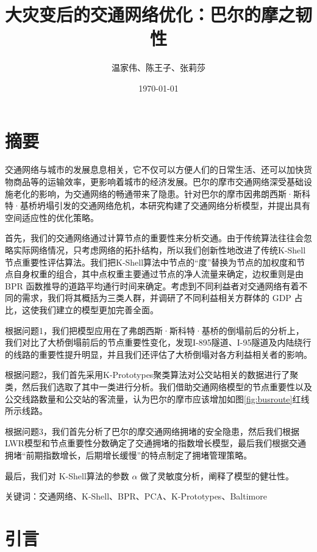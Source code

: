 \documentclass[12pt, a4paper, oneside]{ctexart}
\title{大灾变后的交通网络优化：巴尔的摩之韧性}
\author{温家伟、陈王子、张莉莎}
\date{\today}
\begin{document}
\maketitle


\setcounter{page}{0}
\maketitle
\thispagestyle{empty}

\section{摘要}

交通网络与城市的发展息息相关，它不仅可以方便人们的日常生活、还可以加快货物商品等的运输效率，更影响着城市的经济发展。巴尔的摩市交通网络深受基础设施老化的影响，为交通网络的畅通带来了隐患。针对巴尔的摩市因弗朗西斯·斯科特·基桥坍塌引发的交通网络危机，本研究构建了交通网络分析模型，并提出具有空间适应性的优化策略。

首先，我们的交通网络通过计算节点的重要性来分析交通。由于传统算法往往会忽略实际网络情况，只考虑网络的拓扑结构，所以我们创新性地改进了传统K-Shell节点重要性评估算法。我们把K-Shell算法中节点的“度”替换为节点的加权度和节点自身权重的组合，其中点权重主要通过节点的净人流量来确定，边权重则是由 BPR 函数推导的道路平均通行时间来确定。考虑到不同利益者对交通网络有着不同的需求，我们将其概括为三类人群，并调研了不同利益相关方群体的 GDP 占比，这使我们建立的模型更加完善全面。

根据问题1，我们把模型应用在了弗朗西斯·斯科特·基桥的倒塌前后的分析上，我们对比了大桥倒塌前后的节点重要性变化，发现I-895隧道、I-95隧道及内陆绕行的线路的重要性提升明显，并且我们还评估了大桥倒塌对各方利益相关者的影响。

根据问题2，我们首先采用K-Prototypes聚类算法对公交站相关的数据进行了聚类，然后我们选取了其中一类进行分析。我们借助交通网络模型的节点重要性以及公交线路数量和公交站的客流量，认为巴尔的摩市应该增加如图\ref{fig:busroute}红线所示线路。

根据问题3，我们首先分析了巴尔的摩交通网络拥堵的安全隐患，然后我们根据LWR模型和节点重要性分数确定了交通拥堵的指数增长模型，最后我们根据交通拥堵“前期指数增长，后期增长缓慢”的特点制定了拥堵管理策略。

最后，我们对 K-Shell算法的参数 $\alpha$ 做了灵敏度分析，阐释了模型的健壮性。

关键词：交通网络、K-Shell、BPR、PCA、K-Prototypes、Baltimore

\section{引言}
\end{document}
